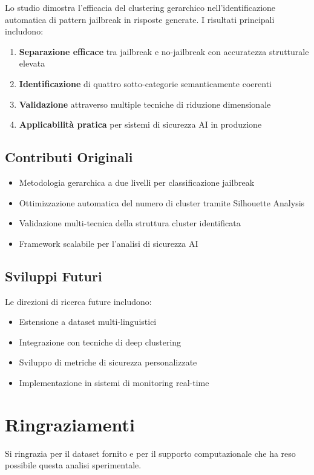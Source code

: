 \documentclass[12pt,a4paper]{article}
\begin{document}
Lo studio dimostra l'efficacia del clustering gerarchico nell'identificazione automatica di pattern jailbreak in risposte generate. I risultati principali includono:

\begin{enumerate}
    \item \textbf{Separazione efficace} tra jailbreak e no-jailbreak con accuratezza strutturale elevata
    \item \textbf{Identificazione} di quattro sotto-categorie semanticamente coerenti
    \item \textbf{Validazione} attraverso multiple tecniche di riduzione dimensionale
    \item \textbf{Applicabilità pratica} per sistemi di sicurezza AI in produzione
\end{enumerate}

\subsection{Contributi Originali}

\begin{itemize}
    \item Metodologia gerarchica a due livelli per classificazione jailbreak
    \item Ottimizzazione automatica del numero di cluster tramite Silhouette Analysis
    \item Validazione multi-tecnica della struttura cluster identificata
    \item Framework scalabile per l'analisi di sicurezza AI
\end{itemize}

\subsection{Sviluppi Futuri}

Le direzioni di ricerca future includono:
\begin{itemize}
    \item Estensione a dataset multi-linguistici
    \item Integrazione con tecniche di deep clustering
    \item Sviluppo di metriche di sicurezza personalizzate
    \item Implementazione in sistemi di monitoring real-time
\end{itemize}

\section*{Ringraziamenti}

Si ringrazia per il dataset fornito e per il supporto computazionale che ha reso possibile questa analisi sperimentale.
\end{document}
